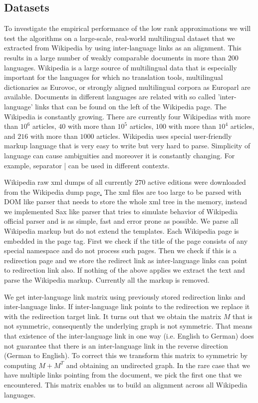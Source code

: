 \documentclass[twoside,11pt]{article}
\begin{document}
\subsection{Datasets}

To investigate the empirical performance of the low rank approximations we will test the algorithms on a large-scale, real-world multilingual dataset that we extracted from Wikipedia by using inter-language links as an alignment. This  results in a large number of weakly comparable documents in more than $200$ languages. Wikipedia is a large source of multilingual data that is especially important for the languages for which no translation tools, multilingual dictionaries as Eurovoc, or strongly aligned multilingual corpora as Europarl are available. Documents in different languages are related with so called 'inter-language' links that can be found on the left of the Wikipedia page. The Wikipedia is constantly growing. There are currently four Wikipedias with more than $10^6$ articles, $40$ with more than $10^5$ articles, $100$ with more than $10^4$ articles, and $216$ with more than $1000$ articles. Wikipedia uses special user-friendly markup language that is very easy to write but very hard to parse. Simplicity of language can cause ambiguities and moreover it is constantly changing. For example, separator | can be used in different contexts.

Wikipedia raw xml dumps of all currently $270$ active editions were downloaded from the Wikipedia dump page\href{http://dumps.wikimedia.org}. The xml files are too large to be parsed with DOM like parser that needs to store the whole xml tree in the memory, instead we implemented Sax like parser that tries to simulate behavior of Wikipedia official parser and is as simple, fast and error prone as possible. We parse all Wikipedia markup but do not extend the templates. Each Wikipedia page is embedded in the page tag. First we check if the title of the page consists of any special namespace and do not process such pages. Then we check if this is a redirection page and we store the redirect link as inter-language links can point to redirection link also. If nothing of the above applies we extract the text and parse the Wikipedia markup. Currently all the markup is removed.

We get inter-language link matrix using previously stored redirection links and inter-language links. If inter-language link points to the redirection we replace it with the redirection target link. It turns out that we obtain the matrix $M$ that is not symmetric, consequently the underlying graph is not symmetric. That means that existence of the inter-language link in one way (i.e. English to German) does not guarantee that there is an inter-language link in the reverse direction (German to English). To correct this we transform this matrix to symmetric by computing $M+M^T$ and obtaining an undirected graph. In the rare case that we have multiple links pointing from the document, we pick the first one that we encountered. This matrix enables us to build an alignment across all Wikipedia languages.
\end{document}
